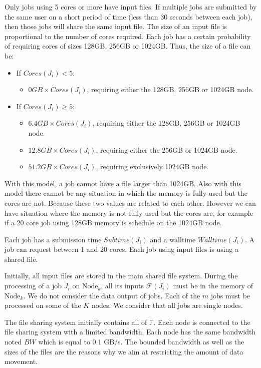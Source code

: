 \documentclass[a4paper]{article}
\newcommand{\Node}[1]{\ensuremath{\mathrm{Node}_{#1}}\xspace}
\newcommand{\inputs}{\ensuremath{\mathcal{F}}\xspace}
\newcommand{\bandwidth}{\mathit{BW}\xspace}
\newcommand{\core}{\mathit{Cores}\xspace}
\newcommand{\submissiontime}{\mathit{Subtime}\xspace}
\newcommand{\walltime}{\mathit{Walltime}\xspace}
\newcommand{\fileset}{\ensuremath{\mathbb{F}}\xspace}
\begin{document}
Only jobs using 5 cores or more have input files.
If multiple jobs are submitted by the same user on a short period of time (less than 30 seconds between each job),
then those jobs will share the same input file.
The size of an input file is proportional to the number of cores required.
Each job has a certain probability of requiring cores of sizes 128GB, 256GB or 1024GB.
Thus, the size of a file can be:
\begin{itemize}
	\item If $\core(J_i) < 5$:
	\begin{itemize}
		\item $0GB \times \core(J_i)$, requiring either the 128GB, 256GB or 1024GB node.
	\end{itemize}
	\item If $\core(J_i) \ge 5$:
	\begin{itemize}
		\item $6.4GB \times \core(J_i)$, requiring either the 128GB, 256GB or 1024GB node.
		\item $12.8GB \times \core(J_i)$, requiring either the 256GB or 1024GB node.
		\item $51.2GB \times \core(J_i)$, requiring exclusively 1024GB node.
	\end{itemize}
\end{itemize}
With this model, a job cannot have a file larger than 1024GB.
Also with this model there cannot be any situation in which the memory is fully used
but the cores are not. Because these two values are related to each other. 
However we can have situation where the memory is not fully used but the cores are,
for example if a 20 core job using 128GB memory is schedule on the 1024GB node.

Each job has a submission time $\submissiontime(J_i)$ and a walltime $\walltime(J_i)$.
A job can request between 1 and 20 cores.
Each job using input files is using a shared file.

Initially, all input files are stored in the main shared file system.
During the processing of a job $J_i$ on $\Node{k}$, all its inputs
$\inputs(J_i)$ must be in the memory of $\Node{k}$. 
We do not consider the data output of jobs.
Each of the $m$ jobs must be processed on some of the $K$ nodes. 
We consider that all jobs are single nodes.

The file sharing system initially contains all of $\fileset$.
Each node is connected to the file sharing system with a limited bandwidth.
Each node has the same bandwidth noted $\bandwidth$ which is equal to 0.1 GB/s.
The bounded bandwidth as well as the sizes of the files are the reasons why
we aim at restricting the amount of data movement.
\end{document}
